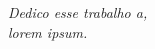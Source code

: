 \begin{dedicatoria}
   \vspace*{\fill}
   \centering
   \noindent
   \textit{Dedico esse trabalho a,\\
   lorem ipsum.} \vspace*{\fill}
\end{dedicatoria}
